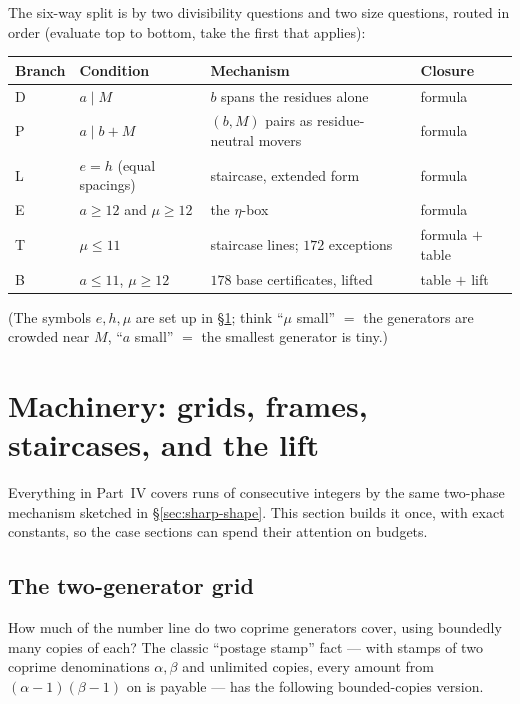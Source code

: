 \documentclass[11pt,reqno]{amsart}
\theoremstyle{plain}
\theoremstyle{definition}
\theoremstyle{remark}
\begin{document}
The six-way split is by two divisibility questions and two size questions,
routed in order (evaluate top to bottom, take the first that applies):

\begin{center}\small
\begin{tabular}{@{}llll@{}}
\toprule
Branch & Condition & Mechanism & Closure \\
\midrule
D & $a \mid M$ & $b$ spans the residues alone & formula \\
P & $a \mid b + M$ & $(b,M)$ pairs as residue-neutral movers & formula \\
L & $e = h$ (equal spacings) & staircase, extended form & formula \\
E & $a \ge 12$ and $\mu \ge 12$ & the $\eta$-box & formula \\
T & $\mu \le 11$ & staircase lines; $172$ exceptions & formula $+$ table \\
B & $a \le 11$, $\mu \ge 12$ & $178$ base certificates, lifted & table $+$ lift \\
\bottomrule
\end{tabular}
\end{center}

\noindent(The symbols $e, h, \mu$ are set up in \S\ref{sec:sharp-machinery}; think
``$\mu$ small'' $=$ the generators are crowded near $M$, ``$a$ small'' $=$ the
smallest generator is tiny.)

\section{Machinery: grids, frames, staircases, and the lift}\label{sec:sharp-machinery}

Everything in Part~IV covers runs of consecutive integers by the same two-phase
mechanism sketched in \S\ref{sec:sharp-shape}. This section builds it once, with
exact constants, so the case sections can spend their attention on budgets.

\subsection{The two-generator grid}

How much of the number line do two coprime generators cover, using boundedly many
copies of each? The classic ``postage stamp'' fact --- with stamps of two coprime
denominations $\alpha, \beta$ and unlimited copies, every amount from
$(\alpha-1)(\beta-1)$ on is payable --- has the following bounded-copies version.
\end{document}
